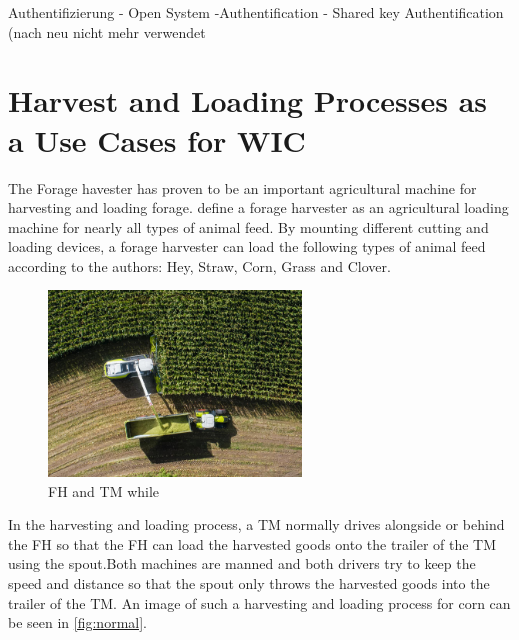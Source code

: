 \documentclass[]{nsm-thesis}
\begin{document}
Authentifizierung
- Open System -Authentification
- Shared key Authentification
(nach neu nicht mehr verwendet

\section{Harvest and Loading Processes as a Use Cases for \ac{WIC}}
The Forage havester has proven to be an important agricultural machine for harvesting and loading forage.
\textcite{seifert_feldhacksler_1962} define a forage harvester as an agricultural loading machine for nearly all types of animal feed. By mounting different cutting and loading devices, a forage harvester can load the following types of animal feed according to the authors: Hey, Straw, Corn, Grass and Clover.

\begin{figure}%
	\centering
	\includegraphics[width=0.6\textwidth]{figures/claas_harvest_side.png}
	\caption{\ac{FH} and \ac{TM} while }%
	\label{fig:normal}%
\end{figure}

In the harvesting and loading process, a \ac{TM} normally drives alongside or behind the \ac{FH} so that the \ac{FH} can load the harvested goods onto the trailer of the \ac{TM} using the spout.Both machines are manned and both drivers try to keep the speed and distance so that the spout only throws the harvested goods into the trailer of the TM. An image of such a harvesting and loading process for corn can be seen in \autoref{fig:normal}.
\end{document}
